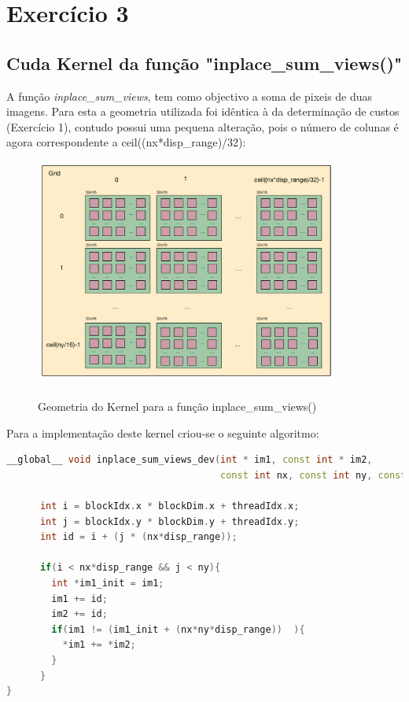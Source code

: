 \documentclass[pdftex,12pt,a4paper]{report}
\begin{document}
\newpage
\section{Exercício 3}

\subsection{Cuda Kernel da função "inplace\_sum\_views()"}

A função \textit{inplace\_sum\_views}, tem como objectivo a soma de pixeis de duas imagens. Para esta a geometria utilizada foi idêntica à da determinação de custos (Exercício 1), contudo possui uma pequena alteração, pois o número de colunas é agora correspondente a ceil((nx*disp\_range)/32):

\begin{figure}[!htb]
\center
 \includegraphics[width=100mm,scale=1]{InplaceSumViews_v1_kernel.pdf}
 \caption{\\ Geometria do Kernel para a função inplace\_sum\_views()}
 \label{fig:InplaceSumViews_v1_kernel}
\end{figure}

Para a implementação deste kernel criou-se o seguinte algoritmo:

  \begin{lstlisting}[language=c++, basicstyle=\scriptsize]
__global__ void inplace_sum_views_dev(int * im1, const int * im2,
                                      const int nx, const int ny, const int disp_range){
    
      int i = blockIdx.x * blockDim.x + threadIdx.x;
      int j = blockIdx.y * blockDim.y + threadIdx.y;
      int id = i + (j * (nx*disp_range));
      
      if(i < nx*disp_range && j < ny){
        int *im1_init = im1;
        im1 += id;
        im2 += id;
        if(im1 != (im1_init + (nx*ny*disp_range))  ){
          *im1 += *im2;
        }
      }
}

\end{lstlisting} 
\end{document}
